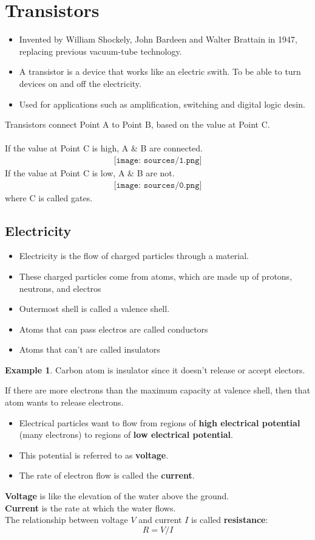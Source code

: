 \documentclass[12pt]{article}
\theoremstyle{definition}
\newtheorem{example}{Example}[section]
\begin{document}
\section{Transistors}
\begin{itemize}
    \item Invented by William Shockely, John Bardeen and Walter Brattain in 1947, replacing previous vacuum-tube technology.
    \item A transistor is a device that works like an electric swith. To be able to turn devices on and off the electricity.
    \item Used for applications such as amplification, switching and digital logic desin.
\end{itemize}
Transistors connect Point A to Point B, based on the value at Point C.\\
\\
If the value at Point C is high, A \& B are connected.
\begin{align*}
    \texttt{[image: sources/1.png]}
\end{align*}
If the value at Point C is low, A \& B are not.
\begin{align*}
    \texttt{[image: sources/0.png]}
\end{align*}
where C is called gates.
\subsection{Electricity}
\begin{itemize}
    \item Electricity is the flow of charged particles through a material.
    \item These charged particles come from atoms, which are made up of protons, neutrons, and electros
    \item Outermost shell is called a valence shell.
    \item Atoms that can pass electros are called conductors
    \item Atoms that can't are called insulators
\end{itemize}
\begin{example}
    Carbon atom is insulator since it doesn't release or accept electors.
\end{example}
If there are more electrons than the maximum capacity at valence shell, then that atom wants to release electrons.
\begin{itemize}
    \item Electrical particles want to flow from regions of \textbf{high electrical potential} (many electrons) to regions of \textbf{low electrical potential}.
    \item This potential is referred to as \textbf{voltage}.
    \item The rate of electron flow is called the \textbf{current}.
\end{itemize}
\textbf{Voltage} is like the elevation of the water above the ground.\\
\textbf{Current} is the rate at which the water flows.\\
The relationship between voltage $V$ and current $I$ is called \textbf{resistance}:
$$R=V/I$$
\end{document}
